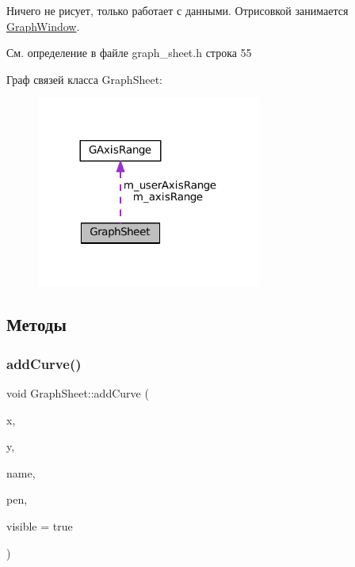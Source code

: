 Ничего не рисует, только работает с данными. Отрисовкой занимается \hyperlink{class_graph_window}{Graph\+Window}. 

См. определение в файле graph\+\_\+sheet.\+h строка 55



Граф связей класса Graph\+Sheet\+:
\nopagebreak
\begin{figure}[H]
\begin{center}
\leavevmode
\includegraphics[width=209pt]{class_graph_sheet__coll__graph}
\end{center}
\end{figure}


\subsection{Методы}
\hypertarget{class_graph_sheet_abce999772aca9f5da197f13fd8912362}{}\label{class_graph_sheet_abce999772aca9f5da197f13fd8912362} 
\subsubsection{\texorpdfstring{add\+Curve()}{addCurve()}}
{\footnotesize\ttfamily void Graph\+Sheet\+::add\+Curve (\begin{DoxyParamCaption}\item[{const Q\+Vector$<$ double $>$ \&}]{x,  }\item[{const Q\+Vector$<$ double $>$ \&}]{y,  }\item[{const Q\+String \&}]{name,  }\item[{const Q\+Pen \&}]{pen,  }\item[{bool}]{visible = {\ttfamily true} }\end{DoxyParamCaption})}



